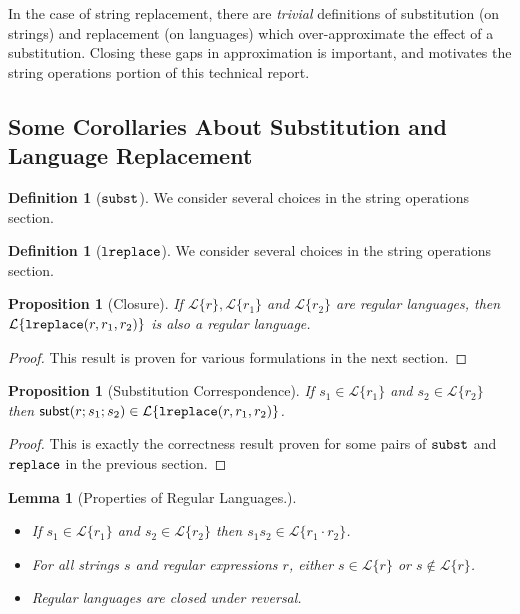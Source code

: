 \documentclass[12pt]{article}
\newtheorem{lem}[thm]{Lemma}
\newtheorem{prop}[thm]{Proposition}
\theoremstyle{definition}
\newtheorem{defn}[thm]{Definition}
\newcommand{\Lagr}{\mathcal{L}}
\newcommand{\lang}[1]{\Lagr\{#1\}}
\newcommand{\lsubst}[3]{{\sf subst}(#1;#2;#3)} %
\newcommand{\lreplace}[3]{{\sf lreplace}(#1; #2; #3)}
\renewcommand{\lreplace}[3]{{\tt lreplace}(#1, #2, #3)}
\begin{document}
In the case of string replacement, there are \emph{trivial} definitions of substitution (on strings) and replacement (on languages) which over-approximate 
the effect of a substitution. Closing these gaps in approximation is important, and motivates the string operations portion of this technical report.

\subsection{Some Corollaries About Substitution and Language Replacement}

\begin{defn}[$\tt{subst}$]
We consider several choices in the string operations section.
\end{defn}

\begin{defn}[$\tt{lreplace}$]
We consider several choices in the string operations section.
\end{defn}

\begin{prop}[Closure] \label{thm:total}
  If $\lang{r}, \lang{r_1}$ and $\lang{r_2}$ are regular languages, then $\lang{\lreplace{r}{r_1}{r_2}}$ is also a regular language.
\end{prop}
\begin{proof}
This result is proven for various formulations in the next section.
\end{proof}

\begin{prop}[Substitution Correspondence] \label{thm:substcorrespondence}
  If $s_1 \in \lang{r_1}$ and $s_2 \in \lang{r_2}$ then $\lsubst{r}{s_1}{s_2} \in \lang{\lreplace{r}{r_1}{r_2}}$.
\end{prop}
\begin{proof}
This is exactly the correctness result proven for some pairs of ${\tt subst}$ and ${\tt replace}$ in the previous section.
\end{proof}

\begin{lem}[Properties of Regular Languages.] \label{thm:regexprops}
~
\begin{itemize}

\item If $s_1 \in \lang{r_1}$ and $s_2 \in \lang{r_2}$ then $s_1s_2 \in \lang{r_1\cdot r_2}$.
\item For all strings $s$ and regular expressions $r$, either $s \in \lang{r}$ or $s \not \in \lang{r}$.
\item Regular languages are closed under reversal.
\end{itemize}
\end{lem}
\end{document}
